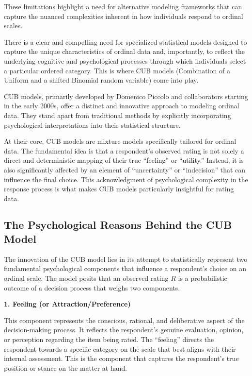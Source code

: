\documentclass[
  letterpaper,
  DIV=11,
  numbers=noendperiod]{scrartcl}
\begin{document}
These limitations highlight a need for alternative modeling frameworks
that can capture the nuanced complexities inherent in how individuals
respond to ordinal scales.

There is a clear and compelling need for specialized statistical models
designed to capture the unique characteristics of ordinal data and,
importantly, to reflect the underlying cognitive and psychological
processes through which individuals select a particular ordered
category. This is where CUB models (Combination of a Uniform and a
shifted Binomial random variable) come into play.

CUB models, primarily developed by Domenico Piccolo and collaborators
starting in the early 2000s, offer a distinct and innovative approach to
modeling ordinal data. They stand apart from traditional methods by
explicitly incorporating psychological interpretations into their
statistical structure.

At their core, CUB models are mixture models specifically tailored for
ordinal data. The fundamental idea is that a respondent's observed
rating is not solely a direct and deterministic mapping of their true
``feeling'' or ``utility.'' Instead, it is also significantly affected
by an element of ``uncertainty'' or ``indecision'' that can influence
the final choice. This acknowledgment of psychological complexity in the
response process is what makes CUB models particularly insightful for
rating data.

\hypertarget{the-psychological-reasons-behind-the-cub-model}{%
\subsection{The Psychological Reasons Behind the CUB
Model}\label{the-psychological-reasons-behind-the-cub-model}}

The innovation of the CUB model lies in its attempt to statistically
represent two fundamental psychological components that influence a
respondent's choice on an ordinal scale. The model posits that an
observed rating \(R\) is a probabilistic outcome of a decision process
that weighs two components.

\textbf{1. Feeling (or Attraction/Preference)}

This component represents the conscious, rational, and deliberative
aspect of the decision-making process. It reflects the respondent's
genuine evaluation, opinion, or perception regarding the item being
rated. The ``feeling'' directs the respondent towards a specific
category on the scale that best aligns with their internal assessment.
This is the component that captures the respondent's true position or
stance on the matter at hand.
\end{document}
